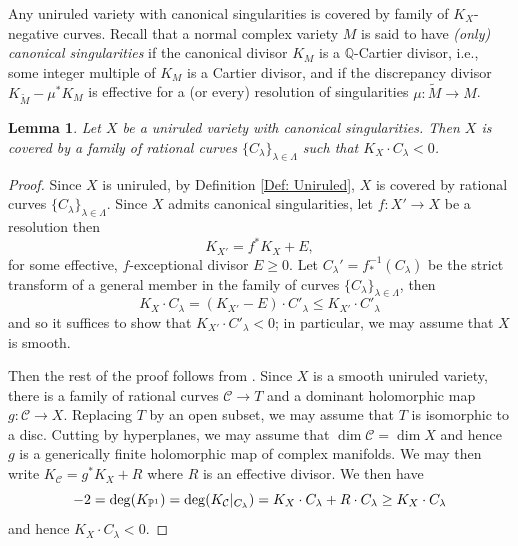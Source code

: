 \documentclass[12pt]{amsart}
\numberwithin{equation}{section}
\newtheorem{lemma}  [theorem]     {Lemma}
\theoremstyle{definition}
\theoremstyle{plain}
\newtheorem*{thm A*}{Theorem A}
\newtheorem*{thm B*}{Theorem B}
\newtheorem*{thm C*}{Theorem C}
\newtheorem*{thm D*}{Theorem D}
\theoremstyle{definition}
\renewcommand{\1}{\mathds{1}}
\renewcommand{\>}{\rightarrow}
\begin{document}
Any uniruled variety with canonical singularities is covered by family of $K_X$-negative curves.
Recall that a normal complex variety $M$ is said to have
\emph{(only) canonical singularities} if the canonical divisor $K_M$
is a {$\mathbb{Q}$-Cartier divisor}, i.e., some integer multiple of
$K_M$ is a Cartier divisor, and if the discrepancy divisor
$K_{\tilde{M}}-\mu^*K_M$ is effective for a (or every) resolution of singularities
$\mu:\tilde{M}\rightarrow M$. 
\begin{lemma}\label{Lemma: NegCurve}
Let $X$ be a uniruled variety with canonical singularities. Then $X$ is covered by a family of rational curves $\{{C}_\lambda\}_{\lambda \in \Lambda}$ such that $K_X\cdot {C}_\lambda <0$. 
\end{lemma}
\begin{proof}
Since $X$ is uniruled, by Definition \ref{Def: Uniruled}, $X$ is covered by rational curves $\{{C}_\lambda\}_{\lambda \in \Lambda}$. Since $X$ admits canonical singularities, let $f:X'\to X$ be a resolution then $$ K_{X'}=f^*K_X+E,$$for some effective, $f$-exceptional divisor $E\ge 0$. Let ${C}_\lambda' = f^{-1}_* ({C}_\lambda)$ be the strict transform of a general member in the family of curves $\{{C}_\lambda\}_{\lambda \in \Lambda}$, then $$K_X\cdot {C}_\lambda=(K_{X'}-E)\cdot {C}'_\lambda\leq K_{X'}\cdot {C}'_\lambda$$ and so it suffices to show that $K_{X'}\cdot {C}'_\lambda<0$; in particular, we may assume that $X$ is smooth.

Then the rest of the proof follows from \cite{Kollar96}. Since $X$ is a smooth uniruled variety, there is a family of rational curves $\mathcal C\to T$ and a dominant holomorphic map $g:\mathcal C \to X$. Replacing $T$ by an open subset, we may assume that $T$ is isomorphic to a disc. Cutting by hyperplanes, we may assume that $\dim \mathcal C=\dim X$ and hence $g$ is a generically finite holomorphic map of complex manifolds. We may then write $K_{\mathcal C}=g^*K_X+R$ where $R$ is an effective divisor. We then have \[-2={\rm deg}(K_{\mathbb P ^1})={\rm deg}(K_{\mathcal C}|_{ C _\lambda})=K_X\cdot  C _\lambda+R\cdot  C _\lambda\ge K_X\cdot C _\lambda\] and hence $K_X\cdot  C _\lambda<0$.
\end{proof}
\end{document}
